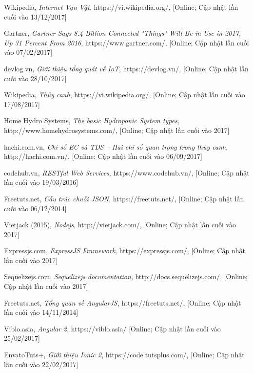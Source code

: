 \documentclass[a4paper,12pt,oneside]{article}
\begin{document}
\newpage
\begin{thebibliography}{80}

 Wikipedia, 
\textit{Internet Vạn Vật}, https://vi.wikipedia.org/, [Online; Cập nhật lần cuối vào 13/12/2017]

 Gartner, \textit{Gartner Says 8.4 Billion Connected "Things" Will Be in Use in 2017, Up 31 Percent From 2016}, https://www.gartner.com/, [Online; Cập nhật lần cuối vào 07/02/2017]

 devlog.vn,
\textit{Giới thiệu tổng quát về IoT}, https://devlog.vn/, [Online; Cập nhật lần cuối vào 28/10/2017]

 Wikipedia,
 \textit{Thủy canh}, https://vi.wikipedia.org/, [Online; Cập nhật lần cuối vào 17/08/2017]

 Home Hydro Systems, 
\textit{The basic Hydroponic System types}, http://www.homehydrosystems.com/, [Online; Cập nhật lần cuối vào 2017]

 hachi.com.vn, 
\textit{Chỉ số EC và TDS – Hai chỉ số quan trọng trong thủy canh}, http://hachi.com.vn/, [Online; Cập nhật lần cuối vào 06/09/2017]

 codehub.vn,
 \textit{RESTful Web Services}, https://www.codehub.vn/, [Online; Cập nhật lần cuối vào 19/03/2016]

 Freetuts.net, 
\textit{Cấu trúc chuỗi JSON}, https://freetuts.net/, [Online; Cập nhật lần cuối vào 06/12/2014]

 Vietjack (2015), 
\textit{Nodejs}, http://vietjack.com/, [Online; Cập nhật lần cuối vào  2017]

 Expressjs.com, 
\textit{ExpressJS Framework}, https://expressjs.com/, [Online; Cập nhật lần cuối vào 2017]

 Sequelizejs.com, 
\textit{Sequelizejs documentation}, http://docs.sequelizejs.com/, [Online; Cập nhật lần cuối vào 2017]

 Freetuts.net, 
\textit{Tổng quan về AngularJS}, https://freetuts.net/, [Online; Cập nhật lần cuối vào 14/11/2014]

 Viblo.asia, 
\textit{Angular 2}, https://viblo.asia/ [Online; Cập nhật lần cuối vào 25/02/2017]

 EnvatoTuts+,
 \textit{Giới thiệu Ionic 2}, https://code.tutsplus.com/, [Online; Cập nhật lần cuối vào 22/02/2017]


\end{thebibliography}
\end{document}
